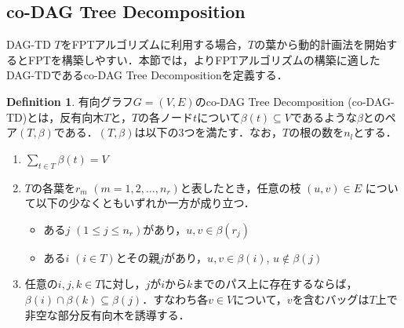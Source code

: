 \documentclass[master]{kuisthesis}		%
\theoremstyle{plain}
\theoremstyle{definition}
\newtheorem{definition*}{Definition}
\begin{document}
\subsection{co-DAG Tree Decomposition}
DAG-TD $T$をFPTアルゴリズムに利用する場合，$T$の葉から動的計画法を開始するとFPTを構築しやすい．本節では，よりFPTアルゴリズムの構築に適したDAG-TDであるco-DAG Tree Decompositionを定義する．


\begin{definition*}
 有向グラフ$G=(V, E)$のco-DAG Tree Decomposition (co-DAG-TD)とは，反有向木$T$と，$T$の各ノード$t$について$\beta(t) \subseteq V$であるような$\beta$とのペア$(T, \beta)$である．$(T, \beta)$は以下の3つを満たす．なお，$T$の根の数を$n_l$とする．
 
\begin{enumerate}
    \item $\sum_{t\in T} \beta(t) = V$ 
    \item $T$の各葉を$r_m$ $(m = 1, 2, \dots, n_r)$と表したとき，任意の枝 $ (u, v) \in E $ について以下の少なくともいずれか一方が成り立つ．
    \begin{itemize}
          \item ある$j$ $(1 \leq j \leq n_r)$があり，$u, v \in \beta(r_j)$
          \item ある$i$ $(i \in T)$とその親$j$があり，$u, v \in \beta(i)$, $u \notin \beta(j)$
    \end{itemize}
    \item 任意の$ i, j, k \in T$に対し，$j$が$i$から$k$までのパス上に存在するならば，$\beta(i) \cap \beta(k) \subseteq \beta(j)$．すなわち各$v \in V$について，$v$を含むバッグは$T$上で非空な部分反有向木を誘導する．
    \end{enumerate}
\end{definition*}

\end{document}
